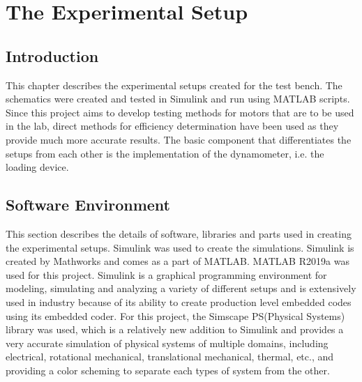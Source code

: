 \chapter{The Experimental Setup} %
\label{Chapter3}

\section{Introduction}

This chapter describes the experimental setups created for the test bench. The schematics were created and tested in Simulink and run using MATLAB scripts. Since this project aims to develop testing methods for motors that are to be used in the lab, direct methods for efficiency determination have been used as they provide much more accurate results. The basic component that differentiates the setups from each other is the implementation of the dynamometer, i.e. the loading device. 

\section{Software Environment}
This section describes the details of software, libraries and parts used in creating the experimental setups. Simulink was used to create the simulations. Simulink is created by Mathworks and comes as a part of MATLAB. MATLAB R2019a was used for this project. Simulink is a graphical programming environment for modeling, simulating and analyzing a variety of different setups and is extensively used in industry because of its ability to create production level embedded codes using its embedded coder. For this project, the Simscape PS(Physical Systems) library was used, which is a relatively new addition to Simulink and provides a very accurate simulation of physical systems\cite{rai2016generalized} of multiple domains, including electrical, rotational mechanical, translational mechanical, thermal, etc., and providing a color scheming to separate each types of system from the other. 

